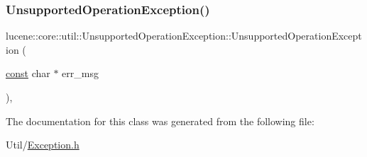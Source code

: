 \subsubsection{\texorpdfstring{Unsupported\+Operation\+Exception()}{UnsupportedOperationException()}\hspace{0.1cm}{\footnotesize\ttfamily [3/3]}}
{\footnotesize\ttfamily lucene\+::core\+::util\+::\+Unsupported\+Operation\+Exception\+::\+Unsupported\+Operation\+Exception (\begin{DoxyParamCaption}\item[{\mbox{\hyperlink{ZlibCrc32_8h_a2c212835823e3c54a8ab6d95c652660e}{const}} char $\ast$}]{err\+\_\+msg }\end{DoxyParamCaption})\hspace{0.3cm}{\ttfamily [inline]}, {\ttfamily [explicit]}}



The documentation for this class was generated from the following file\+:\begin{DoxyCompactItemize}
\item 
Util/\mbox{\hyperlink{Util_2Exception_8h}{Exception.\+h}}\end{DoxyCompactItemize}
